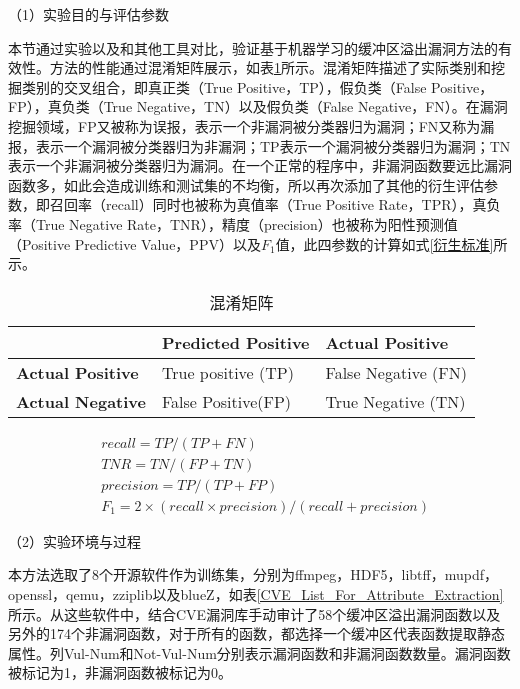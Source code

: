 {（1）实验目的与评估参数

本节通过实验以及和其他工具对比，验证基于机器学习的缓冲区溢出漏洞方法的有效性。方法的性能通过混淆矩阵展示，如表\ref{confusion_matrix}所示。混淆矩阵描述了实际类别和挖掘类别的交叉组合，即真正类（True Positive，TP），假负类（False Positive，FP），真负类（True Negative，TN）以及假负类（False Negative，FN）。在漏洞挖掘领域，FP又被称为误报，表示一个非漏洞被分类器归为漏洞；FN又称为漏报，表示一个漏洞被分类器归为非漏洞；TP表示一个漏洞被分类器归为漏洞；TN表示一个非漏洞被分类器归为漏洞。在一个正常的程序中，非漏洞函数要远比漏洞函数多，如此会造成训练和测试集的不均衡，所以再次添加了其他的衍生评估参数，即召回率（recall）同时也被称为真值率（True Positive Rate，TPR），真负率（True Negative Rate，TNR），精度（precision）也被称为阳性预测值（Positive Predictive Value，PPV）以及$F_1$值，此四参数的计算如式\ref{衍生标准}所示。

\begin{table}[ht]
\begin{center}
\caption{混淆矩阵} \label{confusion_matrix}
\begin{small}
\begin{tabular}{lll}
\hline
 & {\bf Predicted Positive} & {\bf Actual Positive}\\ \hline
{\bf Actual Positive} & True positive (TP) & False Negative (FN)\\ \hline
{\bf Actual Negative} & False Positive(FP) & True Negative (TN)\\ \hline
\end{tabular}
\end{small}
\end{center}
\end{table}

\begin{equation}
\begin{split}
\label{衍生标准}
& recall = TP/(TP+FN) \\
& TNR = TN/(FP+TN) \\
& precision = TP/(TP+FP) \\
& F_1 = 2 \times (recall \times precision)/(recall + precision)
\end{split}
\end{equation}

（2）实验环境与过程

本方法选取了8个开源软件作为训练集，分别为ffmpeg，HDF5，libtff，mupdf，openssl，qemu，zziplib以及blueZ，如表\ref{CVE_List_For_Attribute_Extraction}所示。从这些软件中，结合CVE漏洞库手动审计了58个缓冲区溢出漏洞函数以及另外的174个非漏洞函数，对于所有的函数，都选择一个缓冲区代表函数提取静态属性。列Vul-Num和Not-Vul-Num分别表示漏洞函数和非漏洞函数数量。漏洞函数被标记为1，非漏洞函数被标记为0。

}
